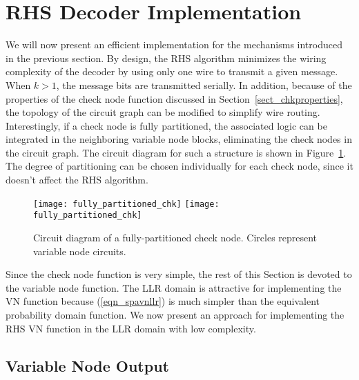 \documentclass[12pt,journal,twoside,draftcls,onecolumn]{IEEEtran}
\begin{document}
\section{RHS Decoder Implementation}
\label{sect_implementation}

We will now present an efficient implementation for the mechanisms introduced in the previous section.
By design, the RHS algorithm minimizes the wiring complexity of the decoder by using only one wire to transmit a given message. When $k>1$, the message bits are transmitted serially.
In addition, because of the properties of the check node function discussed in Section~\ref{sect_chkproperties}, the topology of the circuit graph can be modified to simplify wire routing. Interestingly, if a check node is fully partitioned, the associated logic can be integrated in the neighboring variable node blocks, eliminating the check nodes in the circuit graph. The circuit diagram for such a structure is shown in Figure~\ref{fig_fullypartchk}.
The degree of partitioning can be chosen individually for each check node, since it doesn't affect the RHS algorithm.
\begin{figure}[tbp]
\begin{center}
\ifCLASSOPTIONdraftcls
\texttt{[image: fully\_partitioned\_chk]}
\else
\texttt{[image: fully\_partitioned\_chk]}
\fi
\caption{Circuit diagram of a fully-partitioned check node. Circles represent variable node circuits.}
\label{fig_fullypartchk}
\end{center}
\end{figure}
Since the check node function is very simple, the rest of this Section is devoted to the variable node function.
The LLR domain is attractive for implementing the VN function because (\ref{eqn_spavnllr}) is much simpler than the equivalent probability domain function. We now present an approach for implementing the RHS VN function in the LLR domain with low complexity.

	\subsection{Variable Node Output}
	
\end{document}
